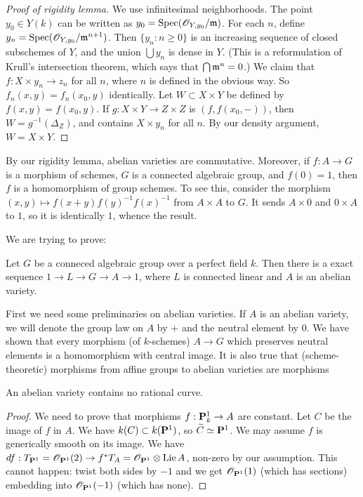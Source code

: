 \begin{proof}[Proof of rigidity lemma]
We use infinitesimal neighborhoods. The point $y_0\in Y(k)$ can be written 
as $y_0=\operatorname{Spec}(\mathscr{O}_{Y,y_0}/\mathfrak{m})$. For each $n$, define 
$y_n = \operatorname{Spec}(\mathscr{O}_{Y,y_0}/\mathfrak{m}^{n+1})$. Then $\{y_n:n\geqslant 0\}$ is 
an increasing sequence of closed subschemes of $Y$, and the union 
$\bigcup y_n$ is dense in $Y$. (This is a reformulation of Krull's 
intersection theorem, which says that $\bigcap \mathfrak{m}^n=0$.) We claim that 
$f:X\times y_n \to z_n$ for all $n$, where $n$ is defined in the obvious 
way.  So $f_n(x,y) = f_n(x_0,y)$ identically. Let 
$W\subset X\times Y$ be defined by $f(x,y) = f(x_0,y)$. If 
$g:X\times Y\to Z\times Z$ is $(f,f(x_0,-))$, then 
$W=g^{-1}(\Delta_Z)$, and contains $X\times y_n$ for all 
$n$. By our density argument, $W=X\times Y$. 
\end{proof}

By our rigidity lemma, abelian varieties are commutative. Moreover, if 
$f:A\to G$ is a morphism of schemes, $G$ is a connected algebraic group, 
and $f(0)=1$, then $f$ is a homomorphism of group schemes. To see this, 
consider the morphism $(x,y)\mapsto f(x+y) f(y)^{-1} f(x)^{-1}$ from 
$A\times A$ to $G$. It sends $A\times 0$ and $0\times A$ to $1$, so it is 
identically $1$, whence the result. 




We are trying to prove: 

\begin{theo}
Let $G$ be a conneced algebraic group over a perfect field $k$. Then there is a 
exact sequence $1 \to L \to G \to A \to 1$, where $L$ is connected linear and 
$A$ is an abelian variety. 
\end{theo}

First we need some preliminaries on abelian varieties. If $A$ is an abelian 
variety, we will denote the group law on $A$ by $+$ and the neutral element 
by $0$. We have shown that every morphism (of $k$-schemes) $A\to G$ which 
preserves neutral elements is a homomorphism with central image. It is also 
true that (scheme-theoretic) morphisms from affine groups to abelian varieties 
are morphisms 

\begin{prop}
An abelian variety contains no rational curve. 
\end{prop}
\begin{proof}
We need to prove that morphisms $f:\mathbf{P}_k^1 \to A$ are constant. Let $C$ be 
the image of $f$ in $A$. We have $k(C)\subset k(\mathbf{P}^1)$, so 
$\widetilde C\simeq \mathbf{P}^1$. We may assume $f$ is generically smooth on its 
image. We have 
$d f:T_{\mathbf{P}^1} = \mathscr{O}_{\mathbf{P}^1}(2) \to f^\ast T_A = \mathscr{O}_{\mathbf{P}^1}\otimes \operatorname{Lie} A$, 
non-zero by our assumption. This cannot happen: twist both sides by $-1$ and 
we get $\mathscr{O}_{\mathbf{P}^1}(1)$ (which has sections) embedding into 
$\mathscr{O}_{\mathbf{P}^1}(-1)$ (which has none). 
\end{proof}

